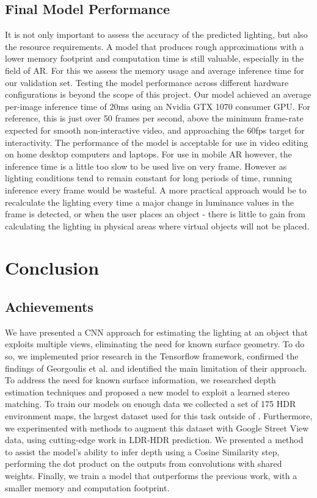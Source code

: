 \documentclass[ %
                    author={Gavin Parker},
                supervisor={Dr. Neill Campbell},
                    degree={MEng},
                     title={Deep Learning for Illumination Estimation from Stereo Images},
                  subtitle={},
                      type={Research},
                      year={2018} ]{dissertation}
\begin{document}
\section{Final Model Performance}
It is not only important to assess the accuracy of the predicted lighting, but also the resource requirements. A model that produces rough approximations with a lower memory footprint and computation time is still valuable, especially in the field of AR. For this we assess the memory usage and average inference time for our validation set. Testing the model performance across different hardware configurations is beyond the scope of this project. Our model achieved an average per-image inference time of 20ms using an Nvidia GTX 1070 consumer GPU. For reference, this is just over 50 frames per second, above the minimum frame-rate expected for smooth non-interactive video, and approaching the 60fps target for interactivity. The performance of the model is acceptable for use in video editing on home desktop computers and laptops. For use in mobile AR however, the inference time is a little too slow to be used live on very frame. However as lighting conditions tend to remain constant for long periods of time, running inference every frame would be wasteful. A more practical approach would be to recalculate the lighting every time a major change in luminance values in the frame is detected, or when the user places an object - there is little to gain from calculating the lighting in physical areas where virtual objects will not be placed.
\chapter{Conclusion}
\label{chap:conclusion}
\section{Achievements}
We have presented a CNN approach for estimating the lighting at an object that exploits multiple views, eliminating the need for known surface geometry. To do so, we implemented prior research in the Tensorflow framework, confirmed the findings of Georgoulis et al. and identified the main limitation of their approach. To address the need for known surface information, we researched depth estimation techniques and proposed a new model to exploit a learned stereo matching. To train our models on enough data we collected a set of 175 HDR environment maps, the largest dataset used for this task outside of \cite{gardner-sigasia-17}. Furthermore, we experimented with methods to augment this dataset with Google Street View data, using cutting-edge work in LDR-HDR prediction. We presented a method to assist the model's ability to infer depth using a Cosine Similarity step, performing the dot product on the outputs from convolutions with shared weights. Finally, we train a model that outperforms the previous work, with a smaller memory and computation footprint.
\end{document}

